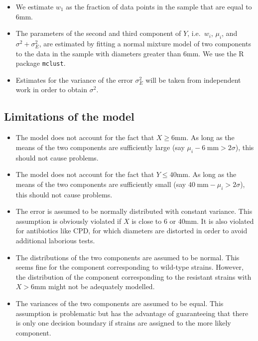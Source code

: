 \documentclass[]{article}
\begin{document}
\begin{itemize}
\itemsep1pt\parskip0pt
\item
  We estimate \(w_1\) as the fraction of data points in the sample that
  are equal to 6\hspace{3pt}mm.
\item
  The parameters of the second and third component of \(Y\),
  i.e.~\(w_i\), \(\mu_i\), and \(\sigma^2+\sigma_E^2\), are estimated by
  fitting a normal mixture model of two components to the data in the
  sample with diameters greater than 6\hspace{3pt}mm. We use the R
  package \texttt{mclust}.
\item
  Estimates for the variance of the error \(\sigma_E^2\) will be taken
  from independent work in order to obtain \(\sigma^2\).
\end{itemize}

\subsection{Limitations of the model}\label{limitations-of-the-model}

\begin{itemize}
\itemsep1pt\parskip0pt
\item
  The model does not account for the fact that \(X\geq6\)\hspace{3pt}mm.
  As long as the means of the two components are sufficiently large (say
  \(\mu_i-6\hspace{3pt}\text{mm}>2\sigma\)), this should not cause
  problems.
\item
  The model does not account for the fact that
  \(Y\leq40\)\hspace{3pt}mm. As long as the means of the two components
  are sufficiently small (say
  \(40\hspace{3pt}\text{mm}-\mu_i>2\sigma\)), this should not cause
  problems.
\item
  The error is assumed to be normally distributed with constant
  variance. This assumption is obviously violated if \(X\) is close to 6
  or 40\hspace{3pt}mm. It is also violated for antibiotics like CPD, for
  which diameters are distorted in order to avoid additional laborious
  tests.
\item
  The distributions of the two components are assumed to be normal. This
  seems fine for the component corresponding to wild-type strains.
  However, the distribution of the component corresponding to the
  resistant strains with \(X>6\)\hspace{3pt}mm might not be adequately
  modelled.
\item
  The variances of the two components are assumed to be equal. This
  assumption is problematic but has the advantage of guaranteeing that
  there is only one decision boundary if strains are assigned to the
  more likely component.
\end{itemize}
\end{document}
